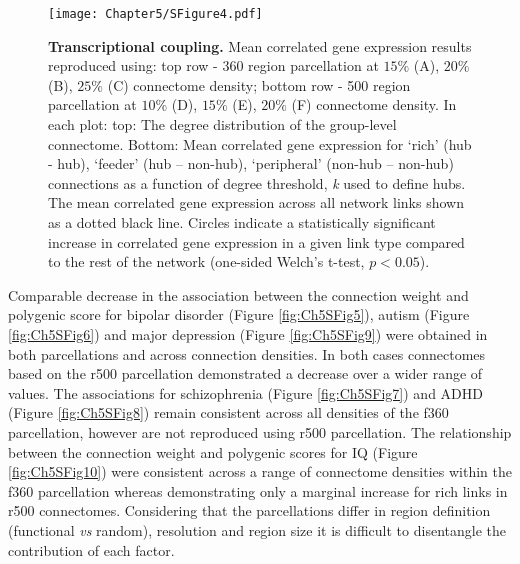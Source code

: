 \begin{figure}[h!]
\begin{center}
\texttt{[image: Chapter5/SFigure4.pdf]}%
\end{center}
\caption{\textbf{Transcriptional coupling.} 
Mean correlated gene expression results reproduced using: top row - 360 region parcellation at $15\%$ (A), $20\%$ (B), $25\%$ (C) connectome density; bottom row - 500 region parcellation at $10\%$ (D), $15\%$ (E), $20\%$ (F) connectome density. In each plot: top: The degree distribution of the group-level connectome. Bottom: Mean correlated gene expression for `rich' (hub - hub), `feeder' (hub – non-hub), `peripheral' (non-hub – non-hub) connections as a function of degree threshold, \textit{k} used to define hubs. The mean correlated gene expression across all network links shown as a dotted black line. Circles indicate a statistically significant increase in correlated gene expression in a given link type compared to the rest of the network (one-sided Welch's t-test, $p < 0.05$).}
\label{fig:Ch5SFig4}
\end{figure}

\clearpage
Comparable decrease in the association between the connection weight and polygenic score for bipolar disorder (Figure \ref{fig:Ch5SFig5}), autism (Figure \ref{fig:Ch5SFig6}) and major depression (Figure \ref{fig:Ch5SFig9}) were obtained in both parcellations and across connection densities. In both cases connectomes based on the r500 parcellation demonstrated a decrease over a wider range of values. The associations for schizophrenia (Figure \ref{fig:Ch5SFig7}) and ADHD (Figure \ref{fig:Ch5SFig8}) remain consistent across all densities of the f360 parcellation, however are not reproduced using r500 parcellation. The relationship between the connection weight and polygenic scores for IQ (Figure \ref{fig:Ch5SFig10}) were consistent across a range of connectome densities within the f360 parcellation whereas demonstrating only a marginal increase for rich links in r500 connectomes. Considering that the parcellations differ in region definition (functional \textit{vs} random), resolution and region size it is difficult to disentangle the contribution of each factor. 

